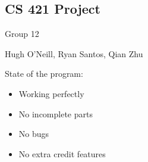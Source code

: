 \documentclass{article}
\begin{document}
	\begin{center}
	\section{CS 421 Project}
	\Large
	Group 12
	
	Hugh O'Neill, Ryan Santos, Qian Zhu
	\end{center}

	\bigskip

	State of the program:
	\begin{itemize}
		\item Working perfectly
		\item No incomplete parts
		\item No bugs
		\item No extra credit features
	\end{itemize}

	\pagebreak
\end{document}

